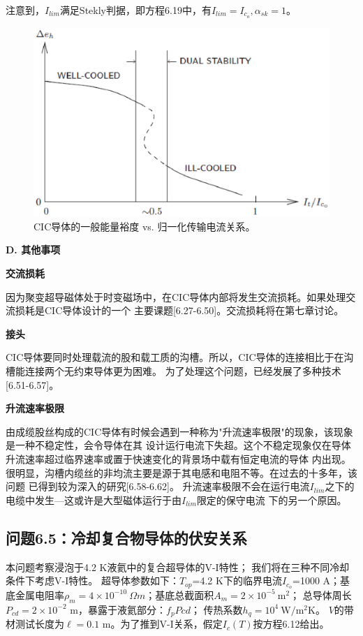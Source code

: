 注意到，$I_{lim}$满足Stekly判据，即方程6.19中，有$I_{lim}=I_{c_o},\alpha_{sk}=1$。
\begin{figure}[htbp]
	\centering
	\includegraphics[scale=0.7]{chpt6/figs/fig6.15.eps}
	\caption{CIC导体的一般能量裕度 vs. 归一化传输电流关系。}
\end{figure}

\textbf{D. 其他事项}

\textbf{交流损耗}

因为聚变超导磁体处于时变磁场中，在CIC导体内部将发生交流损耗。如果处理交流损耗是CIC导体设计的一个
主要课题[6.27-6.50]。交流损耗将在第七章讨论。

\textbf{接头}

CIC导体要同时处理载流的股和载工质的沟槽。所以，CIC导体的连接相比于在沟槽能连接两个无约束导体更为困难。
为了处理这个问题，已经发展了多种技术[6.51-6.57]。

\textbf{升流速率极限}

由成缆股丝构成的CIC导体有时候会遇到一种称为"升流速率极限"的现象，该现象是一种不稳定性，会令导体在其
设计运行电流下失超。这个不稳定现象仅在导体升流速率超过临界速率或置于快速变化的背景场中载有恒定电流的导体
内出现。很明显，沟槽内缆丝的非均流主要是源于其电感和电阻不等。在过去的十多年，该问题
已得到较为深入的研究[6.58-6.62]。
升流速率极限不会在运行电流$I_{lim}$之下的电缆中发生---这或许是大型磁体运行于由$I_{lim}$限定的保守电流
下的另一个原因。

\subsection{问题6.5：冷却复合物导体的伏安关系}
本问题考察浸泡于4.2 K液氦中的复合超导体的V-I特性；
我们将在三种不同冷却条件下考虑V-I特性。
超导体参数如下：$T_{op}$=4.2 K下的临界电流$I_{c_o}$=1000 A；基底金属电阻率$\rho_m=4\times 10^{-10}\ 
\Omega m$；基底总截面积$A_m=2\times 10^{-5}\ \mathrm{m^2}$；
总导体周长$P_{cd}=2\times 10^{-2}$ m，暴露于液氦部分：$f_p P{cd}$；
传热系数$h_q=10^4\ \mathrm{W/m^2K}$。
$V$的带材测试长度为$\ell=0.1$ m。为了推到V-I关系，假定$I_c(T)$按方程6.12给出。

